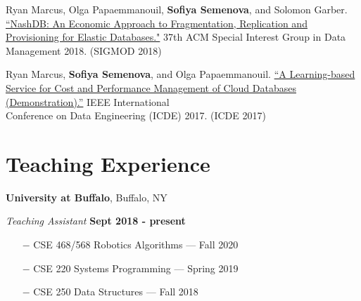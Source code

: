 \documentclass[margin,line]{res}
\begin{document}
\begin{resume}
     Ryan Marcus, Olga Papaemmanouil,  \textbf{Sofiya Semenova}, and Solomon Garber. \href{https://dl.acm.org/doi/10.1145/3301293.3309555}{``NashDB: An Economic Approach to Fragmentation, Replication and Provisioning for Elastic Databases."} 37th ACM Special Interest Group in Data Management 2018. (SIGMOD 2018) 
     
     Ryan Marcus,  \textbf{Sofiya Semenova}, and Olga Papaemmanouil. \href{https://www.cs.brandeis.edu/~olga/publications/icde17-demo.pdf} {``A Learning-based Service for Cost and Performance Management of Cloud Databases (Demonstration).”} IEEE International \\ Conference on Data Engineering (ICDE) 2017. (ICDE 2017)


\section{\sc Teaching Experience}
{\bf University at Buffalo}, Buffalo, NY 

\vspace{-.3cm}
{\em Teaching Assistant} \hfill {\bf Sept 2018 - present}
\begin{itemize}
	\item[$-$] CSE 468/568 Robotics Algorithms --- Fall 2020
	\item[$-$] CSE 220 Systems Programming --- Spring 2019
	\item[$-$] CSE 250 Data Structures --- Fall 2018
\end{itemize}





\end{resume}
\end{document}
